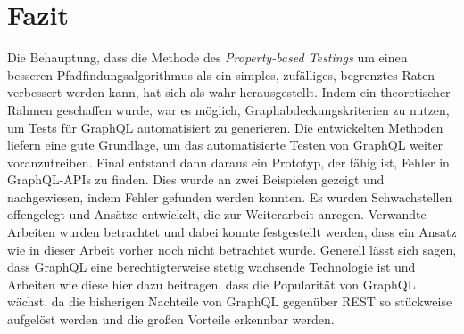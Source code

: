 \chapter{Fazit}
\label{fazit}

Die Behauptung, dass die Methode des \textit{Property-based Testings} um einen besseren Pfadfindungsalgorithmus als ein simples, zufälliges, begrenztes Raten verbessert werden kann, hat sich als wahr herausgestellt.
Indem ein theoretischer Rahmen geschaffen wurde, war es möglich, Graphabdeckungskriterien zu nutzen, um Tests für GraphQL automatisiert zu generieren.
Die entwickelten Methoden liefern eine gute Grundlage, um das automatisierte Testen von GraphQL weiter voranzutreiben.
Final entstand dann daraus ein Prototyp, der fähig ist, Fehler in GraphQL-APIs zu finden.
Dies wurde an zwei Beispielen gezeigt und nachgewiesen, indem Fehler gefunden werden konnten.
Es wurden Schwachstellen offengelegt und Ansätze entwickelt, die zur Weiterarbeit anregen.
Verwandte Arbeiten wurden betrachtet und dabei konnte festgestellt werden, dass ein Ansatz wie in dieser Arbeit vorher noch nicht betrachtet wurde.
Generell lässt sich sagen, dass GraphQL eine berechtigterweise stetig wachsende Technologie ist und Arbeiten wie diese hier
dazu beitragen, dass die Popularität von GraphQL wächst, da die bisherigen Nachteile von GraphQL gegenüber REST so stückweise aufgelöst werden
und die großen Vorteile erkennbar werden.


